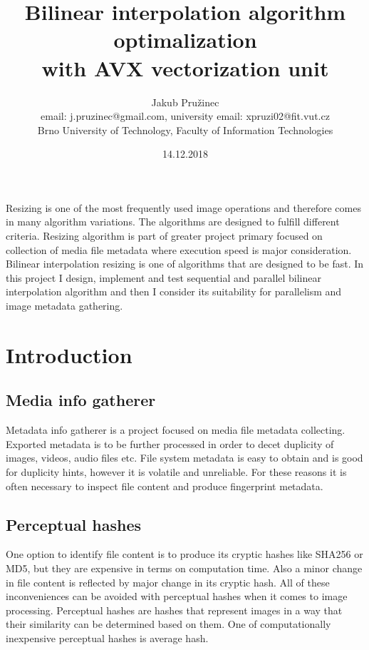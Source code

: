 \documentclass{article}
\title{Bilinear interpolation algorithm optimalization\\
        with AVX vectorization unit}
\author{
        Jakub Pružinec
        \\
        email: j.pruzinec@gmail.com, university email: xpruzi02@fit.vut.cz
        \\
        Brno University of Technology, Faculty of Information Technologies
        \\
        }
\date{14.12.2018}
\begin{document}
\maketitle

\abstract
{
Resizing is one of the most frequently used image operations and therefore comes in many algorithm
variations. The algorithms are designed to fulfill different criteria. Resizing algorithm is
part of greater project primary focused on collection of media file metadata where execution
speed is major consideration. Bilinear interpolation resizing is one of algorithms that are
designed to be fast. In this project I design, implement and test sequential and parallel bilinear
interpolation algorithm and then I consider its suitability for parallelism and image metadata
gathering.
}
\section{Introduction}
\subsection{Media info gatherer}
Metadata info gatherer is a project focused on media file metadata collecting. Exported
metadata is to be further processed in order to decet duplicity of images, videos,
audio files etc. File system metadata is easy to obtain and is good for duplicity hints,
however it is volatile and unreliable. For these reasons it is often necessary to inspect
file content and produce fingerprint metadata.
\subsection{Perceptual hashes}
One option to identify file content is to produce its cryptic hashes like SHA256 or MD5, but
they are expensive in terms on computation time. Also a minor change in file content is
reflected by major change in its cryptic hash. All of these inconveniences can be avoided
with perceptual hashes when it comes to image processing. Perceptual hashes are hashes
that represent images in a way that their similarity can be determined based on them.
One of computationally inexpensive perceptual hashes is average hash.
\end{document}
